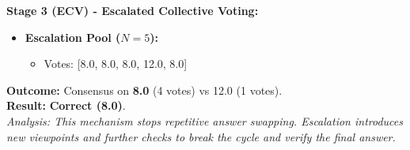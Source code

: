 \documentclass[11pt]{article}
\begin{document}
\begin{tcolorbox}
\vspace{4pt}
\textbf{Stage 3 (ECV) - Escalated Collective Voting:}
\begin{itemize}[leftmargin=1.5em, nosep]
    \item \textbf{Escalation Pool ($N=5$):}
    \begin{itemize}[nosep]
        \item Votes: [8.0, 8.0, 8.0, 12.0, 8.0]
    \end{itemize}
\end{itemize}

\vspace{4pt}
\textbf{Outcome:} Consensus on \textbf{8.0} (4 votes) vs 12.0 (1 votes). \\
\textbf{Result:} \textcolor{green!60!black}{\textbf{Correct (8.0)}}. \\
\textit{Analysis: This mechanism stops repetitive answer swapping. Escalation introduces new viewpoints and further checks to break the cycle and verify the final answer.}
\end{tcolorbox}

\vspace{10pt}
\end{document}
